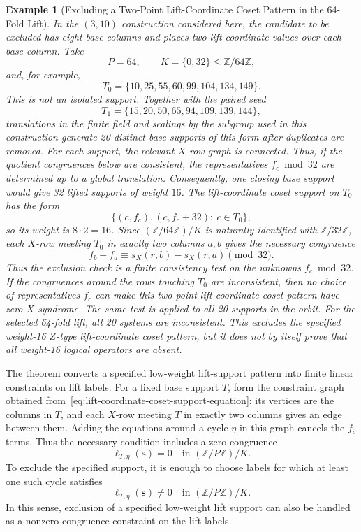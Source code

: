 \documentclass[11pt,a4paper]{article}
\theoremstyle{uprighttheorem}
\newtheorem{example}{Example}
\begin{document}
\begin{example}[Excluding a Two-Point Lift-Coordinate Coset Pattern in the 64-Fold Lift]\label{ex:lift-coordinate-coset-weight16-exclusion}
In the \((3,10)\) construction considered here, the candidate to be excluded has eight base columns and places two lift-coordinate values over each base column.
Take
\[
  P=64,\qquad K=\{0,32\}\le \mathbb Z/64\mathbb Z,
\]
and, for example,
\[
  T_0=\{10,25,55,60,99,104,134,149\}.
\]
This is not an isolated support.
Together with the paired seed
\[
  T_1=\{15,20,50,65,94,109,139,144\},
\]
translations in the finite field and scalings by the subgroup used in this construction generate 20 distinct base supports of this form after duplicates are removed.
For each support, the relevant \(X\)-row graph is connected.
Thus, if the quotient congruences below are consistent, the representatives \(f_c\bmod 32\) are determined up to a global translation.
Consequently, one closing base support would give 32 lifted supports of weight \(16\).
The lift-coordinate coset support on \(T_0\) has the form
\[
  \{(c,f_c),(c,f_c+32):\ c\in T_0\},
\]
so its weight is \(8\cdot2=16\).
Since \((\mathbb Z/64\mathbb Z)/K\) is naturally identified with \(\mathbb Z/32\mathbb Z\), each \(X\)-row meeting \(T_0\) in exactly two columns \(a,b\) gives the necessary congruence
\[
  f_b-f_a \equiv s_X(r,b)-s_X(r,a)\pmod {32}.
\]
Thus the exclusion check is a finite consistency test on the unknowns \(f_c\bmod 32\).
If the congruences around the rows touching \(T_0\) are inconsistent, then no choice of representatives \(f_c\) can make this two-point lift-coordinate coset pattern have zero \(X\)-syndrome.
The same test is applied to all 20 supports in the orbit.
For the selected 64-fold lift, all 20 systems are inconsistent.
This excludes the specified weight-16 \(Z\)-type lift-coordinate coset pattern, but it does not by itself prove that all weight-16 logical operators are absent.
\end{example}

The theorem converts a specified low-weight lift-support pattern into finite linear constraints on lift labels.
For a fixed base support \(T\), form the constraint graph obtained from~\eqref{eq:lift-coordinate-coset-support-equation}: its vertices are the columns in \(T\), and each \(X\)-row meeting \(T\) in exactly two columns gives an edge between them.
Adding the equations around a cycle \(\eta\) in this graph cancels the \(f_c\) terms.
Thus the necessary condition includes a zero congruence
\[
  \ell_{T,\eta}(\bm s)=0
  \quad\text{in }(\mathbb Z/P\mathbb Z)/K .
\]
To exclude the specified support, it is enough to choose labels for which at least one such cycle satisfies
\[
  \ell_{T,\eta}(\bm s)\ne0
  \quad\text{in }(\mathbb Z/P\mathbb Z)/K .
\]
In this sense, exclusion of a specified low-weight lift support can also be handled as a nonzero congruence constraint on the lift labels.
\end{document}
